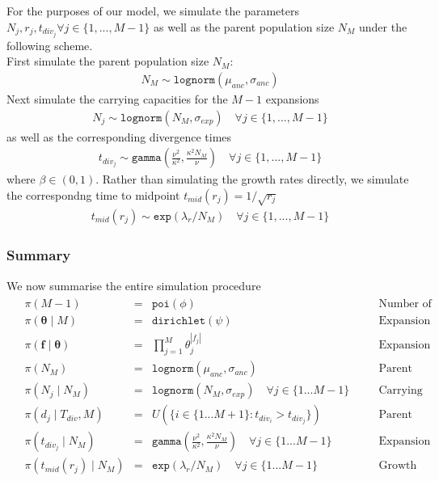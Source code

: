 \documentclass{report}
\theoremstyle{definition}
\begin{document}
For the purposes of our model, we simulate the parameters $N_j, r_j, t_{div_j} \forall j \in \{1,...,M-1\}$ as well as the parent population size $N_{M}$ under the following scheme.\\
First simulate the parent population size $N_{M}$:
\begin{gather}
N_{M} \sim \texttt{lognorm}(\mu_{anc}, \sigma_{anc})
\end{gather}
Next simulate the carrying capacities for the $M-1$ expansions
\begin{gather}
N_{j} \sim \texttt{lognorm}(N_{M}, \sigma_{exp}) \quad\forall j \in \{1,...,M-1\}
\end{gather}
as well as the corresponding divergence times
\begin{gather}
t_{div_j} \sim \texttt{gamma}\left(\frac{\nu^2}{\kappa^2}, \frac{\kappa^2 N_M}{\nu}\right) \quad\forall j \in \{1,...,M-1\}
\end{gather}
where $\beta \in (0,1)$.
Rather than simulating the growth rates directly, we simulate the correspondng time to midpoint $t_{mid}(r_j) = 1/\sqrt{r_j}$
\begin{gather}
t_{mid}(r_j) \sim \texttt{exp}(\lambda_r/N_M) \quad\forall j \in \{1,...,M-1\}
\end{gather} 
\subsubsection{Summary}
We now summarise the entire simulation procedure
\begin{gather}
\begin{aligned}
&\pi(M-1) &=& \texttt{poi}(\phi) &\quad&\text{Number of expansions} \\
&\pi(\pmb\theta\mid M) &=& \texttt{dirichlet}(\psi) &\quad&\text{Expansion Membership Probabilities} \\
&\pi(\mathbf{f\mid\pmb\theta}) &=& \prod\limits_{j=1}^M\theta_j^{|f_j|}&\quad&\text{Expansion Membership Assignment} \\
&\pi(N_M) &=& \texttt{lognorm}(\mu_{anc},\sigma_{anc}) &\quad&\text{Parent Population Size}\\
&\pi(N_j\mid N_{M}) &=& \texttt{lognorm}(N_{M},\sigma_{exp})\quad\forall j \in \{1...M-1\} &\quad&\text{Carrying Capacities}\\
&\pi(d_j\mid T_{div}, M) &=& U(\{i\in \{1 ... M+1\} : t_{div_i} > t_{div_j}\}) &\quad&\text{Parent Populations}\\
&\pi(t_{div_j}\mid N_{M}) &=& \texttt{gamma}\left(\frac{\nu^2}{\kappa^2}, \frac{\kappa^2 N_M}{\nu}\right) \quad\forall j \in \{1...M-1\} &\quad&\text{Expansion Times}\\
&\pi(t_{mid}(r_j)\mid N_M) &=& \texttt{exp}(\lambda_{r}/N_M)\quad\forall j \in \{1...M-1\} &\quad&\text{Growth Rates/Time to Midpoint}
\end{aligned}
\end{gather}
\end{document}
